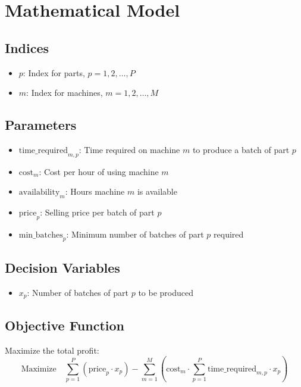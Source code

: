 \documentclass{article}
\begin{document}
\section*{Mathematical Model}

\subsection*{Indices}
\begin{itemize}
    \item \( p \): Index for parts, \( p = 1, 2, \ldots, P \)
    \item \( m \): Index for machines, \( m = 1, 2, \ldots, M \)
\end{itemize}

\subsection*{Parameters}
\begin{itemize}
    \item \( \text{time\_required}_{m,p} \): Time required on machine \( m \) to produce a batch of part \( p \)
    \item \( \text{cost}_{m} \): Cost per hour of using machine \( m \)
    \item \( \text{availability}_{m} \): Hours machine \( m \) is available
    \item \( \text{price}_{p} \): Selling price per batch of part \( p \)
    \item \( \text{min\_batches}_{p} \): Minimum number of batches of part \( p \) required
\end{itemize}

\subsection*{Decision Variables}
\begin{itemize}
    \item \( x_p \): Number of batches of part \( p \) to be produced
\end{itemize}

\subsection*{Objective Function}
Maximize the total profit:
\[
\text{Maximize} \quad \sum_{p=1}^{P} \left( \text{price}_{p} \cdot x_p \right) - \sum_{m=1}^{M} \left( \text{cost}_{m} \cdot \sum_{p=1}^{P} \text{time\_required}_{m,p} \cdot x_p \right)
\]
\end{document}
